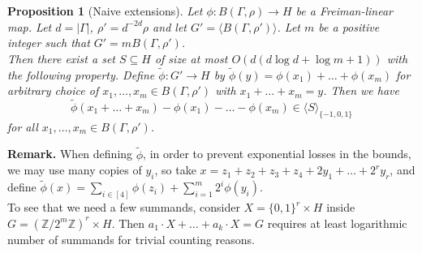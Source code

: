\documentclass[a4paper,11pt]{article}
\numberwithin{theorem}{section}
\newtheorem{proposition}[theorem]{Proposition}
\theoremstyle{definition}
\begin{document}
\begin{proposition}[Naive extensions]\label{generalextensionserror}
    Let $\phi : B(\Gamma, \rho) \to H$ be a Freiman-linear map. Let $d = |\Gamma|$, $\rho' = d^{-2d} \rho$ and let $G' = \langle B(\Gamma, \rho') \rangle$. Let $m$ be a positive integer such that $G' = m B(\Gamma, \rho')$.\\
    \indent Then there exist a set $S \subseteq H$ of size at most $O(d (d \log d + \log m + 1))$ with the following property. Define $\tilde{\phi} : G' \to H$ by $\tilde{\phi}(y) = \phi(x_1) + \dots + \phi(x_m)$ for arbitrary choice of $x_1, \dots, x_m \in B(\Gamma, \rho')$ with $x_1 + \dots + x_m = y$. Then we have
    \begin{equation}
        \tilde{\phi}(x_1 + \dots + x_m) - \phi(x_1) - \dots - \phi(x_m) \in \langle S\rangle_{\{-1, 0, 1\}} \label{tildePhiDefinIngenextn}
    \end{equation}
    for all $x_1, \dots, x_m \in B(\Gamma, \rho')$.
\end{proposition}

\textbf{Remark.} When defining $\tilde{\phi}$, in order to prevent exponential losses in the bounds, we may use many copies of $y_i$, so take $x = z_1 + z_2 + z_3 + z_4 + 2 y_1 + \dots + 2^r y_r$, and define $\tilde{\phi}(x) = \sum_{i \in [4]} \phi(z_i) +  \sum_{i = 1}^m 2^i \phi(y_i)$.\\
\indent To see that we need a few summands, consider $X = \{0,1\}^r \times H$ inside $G = (\mathbb{Z}/2^m\mathbb{Z})^r \times H$. Then $a_1 \cdot X + \dots + a_k \cdot X = G$ requires at least logarithmic number of summands for trivial counting reasons. 

\vspace{\baselineskip}
\end{document}

